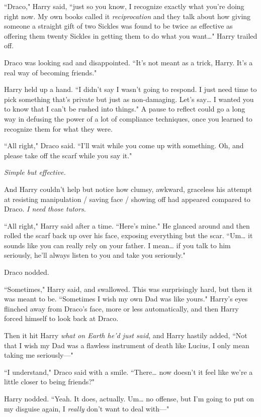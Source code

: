 ``Draco," Harry said, ``just so you know, I recognize exactly what you're doing right now. My own books called it \emph{reciprocation} and they talk about how giving someone a straight gift of two Sickles was found to be twice as effective as offering them twenty Sickles in getting them to do what you want{\ldots}" Harry trailed off.

Draco was looking sad and disappointed. ``It's not meant as a trick, Harry. It's a real way of becoming friends."

Harry held up a hand. ``I didn't say I wasn't going to respond. I just need time to pick something that's private but just as non-damaging. Let's say{\ldots} I wanted you to know that I can't be rushed into things." A pause to reflect could go a long way in defusing the power of a lot of compliance techniques, once you learned to recognize them for what they were.

``All right," Draco said. ``I'll wait while you come up with something. Oh, and please take off the scarf while you say it."

\emph{Simple but effective.}

And Harry couldn't help but notice how clumsy, awkward, graceless his attempt at resisting manipulation / saving face / showing off had appeared compared to Draco. \emph{I need those tutors.}

``All right," Harry said after a time. ``Here's mine." He glanced around and then rolled the scarf back up over his face, exposing everything but the scar. ``Um{\ldots} it sounds like you can really rely on your father. I mean{\ldots} if you talk to him seriously, he'll always listen to you and take you seriously."

Draco nodded.

``Sometimes," Harry said, and swallowed. This was surprisingly hard, but then it was meant to be. ``Sometimes I wish my own Dad was like yours." Harry's eyes flinched away from Draco's face, more or less automatically, and then Harry forced himself to look back at Draco.

Then it hit Harry \emph{what on Earth he'd just said}, and Harry hastily added, ``Not that I wish my Dad was a flawless instrument of death like Lucius, I only mean taking me seriously—"

``I understand," Draco said with a smile. ``There{\ldots} now doesn't it feel like we're a little closer to being friends?"

Harry nodded. ``Yeah. It does, actually. Um{\ldots} no offense, but I'm going to put on my disguise again, I \emph{really} don't want to deal with—"

